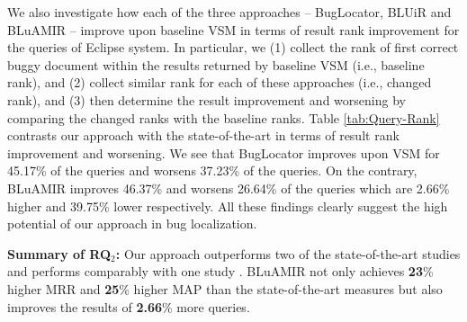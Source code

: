 \documentclass[conference]{IEEEtran}
\begin{document}
We also investigate how each of the three approaches -- BugLocator, BLUiR and BLuAMIR -- improve upon baseline VSM in terms of result rank improvement for the queries of Eclipse system. In particular, we (1) collect the rank of first correct buggy document within the results returned by baseline VSM (i.e., baseline rank), and (2) collect similar rank for each of these approaches (i.e., changed rank), and (3) then determine the result improvement and worsening by comparing the changed ranks with the baseline ranks. Table \ref{tab:Query-Rank} contrasts our approach with the state-of-the-art in terms of result rank improvement and worsening. We see that BugLocator improves upon VSM for 45.17\% of the queries and worsens 37.23\% of the queries. On the contrary, BLuAMIR improves 46.37\% and worsens 26.64\% of the queries which are 2.66\% higher and 39.75\% lower respectively. All these findings clearly suggest the high potential of our approach in bug localization.    

\begin{framed}
	\noindent
	\textbf{Summary of RQ$_2$:} Our approach outperforms two of the state-of-the-art studies \cite{Nguyen,Jian} and performs comparably with one study \cite{Saha}. BLuAMIR not only achieves \textbf{23}\% higher MRR and \textbf{25}\% higher MAP than the state-of-the-art measures but also improves the results of \textbf{2.66}\% more queries.
\end{framed}
 

\end{document}
